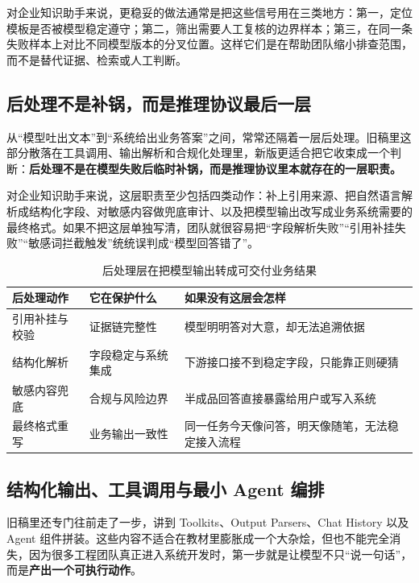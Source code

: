 对企业知识助手来说，更稳妥的做法通常是把这些信号用在三类地方：第一，定位模板是否被模型稳定遵守；第二，筛出需要人工复核的边界样本；第三，在同一条失败样本上对比不同模型版本的分叉位置。这样它们是在帮助团队缩小排查范围，而不是替代证据、检索或人工判断。

\subsection{后处理不是补锅，而是推理协议最后一层}
从“模型吐出文本”到“系统给出业务答案”之间，常常还隔着一层后处理。旧稿里这部分散落在工具调用、输出解析和合规化处理里，新版更适合把它收束成一个判断：\textbf{后处理不是在模型失败后临时补锅，而是推理协议里本就存在的一层职责。}

对企业知识助手来说，这层职责至少包括四类动作：补上引用来源、把自然语言解析成结构化字段、对敏感内容做兜底审计、以及把模型输出改写成业务系统需要的最终格式。如果不把这层单独写清，团队就很容易把“字段解析失败”“引用补挂失败”“敏感词拦截触发”统统误判成“模型回答错了”。

\begin{table}[H]
\centering
\small
\begin{tabularx}{\textwidth}{>{\raggedright\arraybackslash}p{3cm}>{\raggedright\arraybackslash}p{3.2cm}>{\raggedright\arraybackslash}X}
\toprule
\textbf{后处理动作} & \textbf{它在保护什么} & \textbf{如果没有这层会怎样} \\
\midrule
引用补挂与校验 & 证据链完整性 & 模型明明答对大意，却无法追溯依据 \\
结构化解析 & 字段稳定与系统集成 & 下游接口接不到稳定字段，只能靠正则硬猜 \\
敏感内容兜底 & 合规与风险边界 & 半成品回答直接暴露给用户或写入系统 \\
最终格式重写 & 业务输出一致性 & 同一任务今天像问答，明天像随笔，无法稳定接入流程 \\
\bottomrule
\end{tabularx}
\caption{后处理层在把模型输出转成可交付业务结果}
\label{tab:postprocess-role}
\end{table}

\subsection{结构化输出、工具调用与最小 Agent 编排}
旧稿里还专门往前走了一步，讲到 Toolkits、Output Parsers、Chat History 以及 Agent 组件拼装。这些内容不适合在教材里膨胀成一个大杂烩，但也不能完全消失，因为很多工程团队真正进入系统开发时，第一步就是让模型不只“说一句话”，而是\textbf{产出一个可执行动作}。


